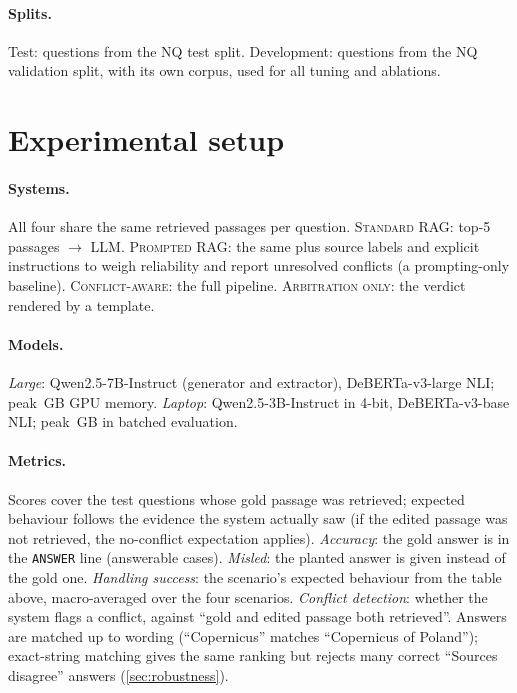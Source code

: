 \documentclass[11pt]{article}
\newcommand{\sys}[1]{\textsc{#1}}
\begin{document}
\paragraph{Splits.} Test:  questions from the NQ test split. Development:
 questions from the NQ validation split, with its own corpus, used for all tuning and
ablations.

\section{Experimental setup}
\paragraph{Systems.} All four share the same retrieved passages per question.
\sys{Standard RAG}: top-5 passages $\to$ LLM. \sys{Prompted RAG}: the same plus source labels and
explicit instructions to weigh reliability and report unresolved conflicts (a prompting-only
baseline). \sys{Conflict-aware}: the full pipeline. \sys{Arbitration only}: the verdict rendered by
a template.

\paragraph{Models.} \emph{Large}: Qwen2.5-7B-Instruct (generator and extractor),
DeBERTa-v3-large NLI; peak \,GB GPU memory. \emph{Laptop}: Qwen2.5-3B-Instruct in
4-bit, DeBERTa-v3-base NLI; peak \,GB in batched evaluation.

\paragraph{Metrics.} Scores cover the  test questions whose gold passage was
retrieved; expected behaviour follows the evidence the system actually saw (if the edited passage
was not retrieved, the no-conflict expectation applies).
\emph{Accuracy}: the gold answer is in the \texttt{ANSWER} line (answerable cases).
\emph{Misled}: the planted answer is given instead of the gold one.
\emph{Handling success}: the scenario's expected behaviour from the table above, macro-averaged
over the four scenarios.
\emph{Conflict detection}: whether the system flags a conflict, against ``gold and edited passage
both retrieved''.
Answers are matched up to wording (``Copernicus'' matches ``Copernicus of Poland''); exact-string
matching gives the same ranking but rejects many correct ``Sources disagree'' answers
(\cref{sec:robustness}).
\end{document}
